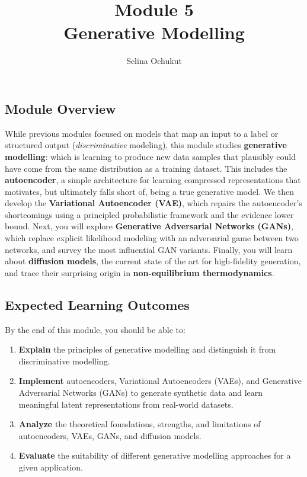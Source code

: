 \documentclass[12pt,a4paper]{article}
\title{\color{moduleblue}\Huge \textbf{Module 5}\\[0.3em]
\Large Generative Modelling}
\author{Selina Ochukut}
\date{}
\begin{document}
\maketitle

\begin{tcolorbox}[colback=moduleblue!6, colframe=moduleblue, arc=2mm, boxrule=1pt]
\subsection*{Module Overview}
 While previous modules focused on models that map an input to a label or structured output (\emph{discriminative} modeling), this module studies \textbf{generative modelling}: which is learning to produce new data samples that plausibly could have come from the same distribution as a training dataset. This includes the \textbf{autoencoder}, a simple architecture for learning compressed representations that motivates, but ultimately falls short of, being a true generative model. We then develop the \textbf{Variational Autoencoder (VAE)}, which repairs the autoencoder's shortcomings using a principled probabilistic framework and the evidence lower bound. Next, you will explore \textbf{Generative Adversarial Networks (GANs)}, which replace explicit likelihood modeling with an adversarial game between two networks, and survey the most influential GAN variants. Finally, you will learn about \textbf{diffusion models}, the current state of the art for high-fidelity generation, and trace their surprising origin in \textbf{non-equilibrium thermodynamics}.
\end{tcolorbox}

\subsection*{Expected Learning Outcomes}

By the end of this module, you should be able to:
\begin{enumerate}
    \item \textbf{Explain} the principles of generative modelling and distinguish it from discriminative modelling.
    \item \textbf{Implement} autoencoders, Variational Autoencoders (VAEs), and Generative Adversarial Networks (GANs) to generate synthetic data and learn meaningful latent representations from real-world datasets.
    \item \textbf{Analyze} the theoretical foundations, strengths, and limitations of autoencoders, VAEs, GANs, and diffusion models.
    \item \textbf{Evaluate} the suitability of different generative modelling approaches for a given application.
\end{enumerate}
\end{document}
